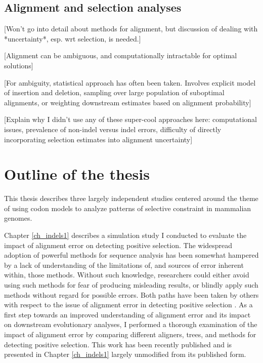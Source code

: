 \subsection{Alignment and selection analyses}

[Won't go into detail about methods for alignment,
  but discussion of dealing with *uncertainty*, esp. wrt selection, is needed.]

[Alignment can be ambiguous, and computationally intractable for optimal solutions]

[For ambiguity, statistical approach has often been taken. Involves
  explicit model of insertion and deletion, sampling over large
  population of suboptimal alignments, or weighting downstream estimates based on alignment probability]

[Explain why I didn't use any of these super-cool approaches here:
  computational issues, prevalence of non-indel versus indel errors,
  difficulty of directly incorporating selection estimates into
  alignment uncertainty]


\section{Outline of the thesis}

This thesis describes three largely independent studies centered
around the theme of using codon models to analyze patterns of
selective constraint in mammalian genomes.

Chapter \ref{ch_indels1} describes a simulation study I conducted to
evaluate the impact of alignment error on detecting \sw positive
selection. The widespread adoption of powerful methods for sequence
analysis has been somewhat hampered by a lack of understanding of the
limitations of, and sources of error inherent within, those
methods. Without such knowledge, researchers could either avoid using
such methods for fear of producing misleading results, or blindly
apply such methods without regard for possible errors. Both paths have
been taken by others with respect to the issue of alignment error in
detecting positive selection
\citep{Thompson1994,Bakewell2007,Studer2008,MarkovaRaina2011}. As a
first step towards an improved understanding of alignment error and
its impact on downstream evolutionary analyses, I performed a thorough
examination of the impact of alignment error by comparing different
aligners, trees, and methods for detecting positive selection. This
work has been recently published \citep{Jordan2011} and is presented
in Chapter \ref{ch_indels1} largely unmodified from its published
form.

